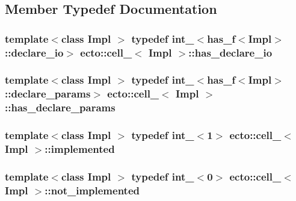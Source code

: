 \subsection{Member Typedef Documentation}
\hypertarget{structecto_1_1cell___a10ab0d3f85e194d548beb3251416a569}{
\subsubsection[{has\-\_\-declare\-\_\-io}]{\setlength{\rightskip}{0pt plus 5cm}template$<$class Impl $>$ typedef {\bf int\-\_\-}$<${\bf has\-\_\-f}$<$Impl$>$\-::{\bf declare\-\_\-io}$>$ {\bf ecto\-::cell\-\_\-}$<$ Impl $>$\-::{\bf has\-\_\-declare\-\_\-io}}}\label{structecto_1_1cell___a10ab0d3f85e194d548beb3251416a569}
\hypertarget{structecto_1_1cell___ab7b111eb2672ae4eaacc668852b8b89f}{
\subsubsection[{has\-\_\-declare\-\_\-params}]{\setlength{\rightskip}{0pt plus 5cm}template$<$class Impl $>$ typedef {\bf int\-\_\-}$<${\bf has\-\_\-f}$<$Impl$>$\-::{\bf declare\-\_\-params}$>$ {\bf ecto\-::cell\-\_\-}$<$ Impl $>$\-::{\bf has\-\_\-declare\-\_\-params}}}\label{structecto_1_1cell___ab7b111eb2672ae4eaacc668852b8b89f}
\hypertarget{structecto_1_1cell___a63c5c3dd95630a508017730ee345c23a}{
\subsubsection[{implemented}]{\setlength{\rightskip}{0pt plus 5cm}template$<$class Impl $>$ typedef {\bf int\-\_\-}$<$1$>$ {\bf ecto\-::cell\-\_\-}$<$ Impl $>$\-::{\bf implemented}}}\label{structecto_1_1cell___a63c5c3dd95630a508017730ee345c23a}
\hypertarget{structecto_1_1cell___a3e48e52421d132bb2bb4e343f771abeb}{
\subsubsection[{not\-\_\-implemented}]{\setlength{\rightskip}{0pt plus 5cm}template$<$class Impl $>$ typedef {\bf int\-\_\-}$<$0$>$ {\bf ecto\-::cell\-\_\-}$<$ Impl $>$\-::{\bf not\-\_\-implemented}}}\label{structecto_1_1cell___a3e48e52421d132bb2bb4e343f771abeb}

